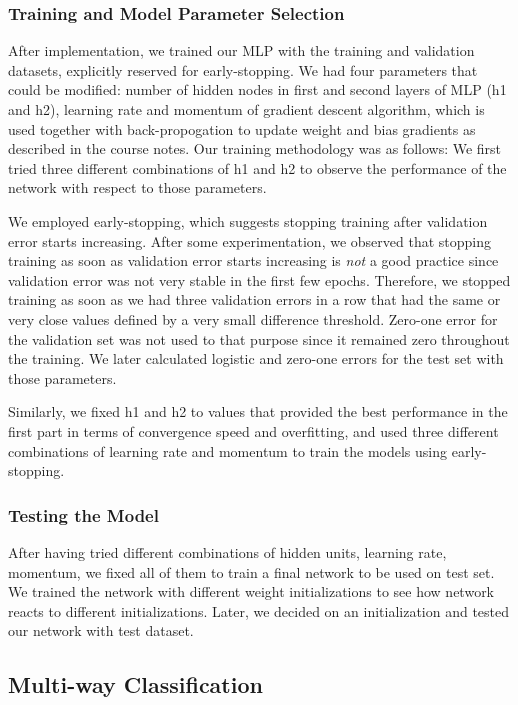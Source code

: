 \documentclass[10pt]{article}
\begin{document}
\subsubsection{Training and Model Parameter Selection}
After implementation, we trained our MLP with the training and validation datasets, explicitly reserved for early-stopping. We had four parameters that could be modified: number of hidden nodes in first and second layers of MLP (h1 and h2), learning rate and momentum of gradient descent algorithm, which is used together with back-propogation to update weight and bias gradients as described in the course notes. Our training methodology was as follows: We first tried three different combinations of h1 and h2 to observe the performance of the network with respect to those parameters. 

We employed early-stopping, which suggests stopping training after validation error starts increasing. After some experimentation, we observed that stopping training as soon as validation error starts increasing is \textit{not} a good practice since validation error was not very stable in the first few epochs. Therefore, we stopped training as soon as we had three validation errors in a row that had the same or very close values defined by a very small difference threshold. Zero-one error for the validation set was not used to that purpose since it remained zero throughout the training. We later calculated logistic and zero-one errors for the test set with those parameters. 

Similarly, we fixed h1 and h2 to values that provided the best performance in the first part in terms of convergence speed and overfitting, and used three different combinations of learning rate and momentum to train the models using early-stopping.

\subsubsection{Testing the Model}
After having tried different combinations of hidden units, learning rate, momentum, we fixed all of them to train a final network to be used on test set. We trained the network with different weight initializations to see how network reacts to different initializations. Later, we decided on an initialization and tested our network with test dataset.

\subsection{Multi-way Classification}
\end{document}
